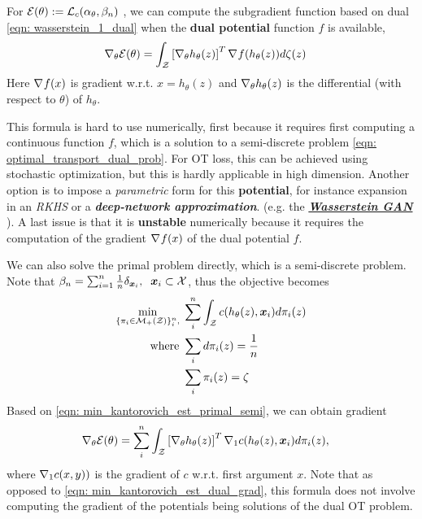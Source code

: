 \documentclass[11pt]{article}
\begin{document}
For ${\mathcal E}(\theta):={\mathcal L}_{c}(\alpha_{\theta}, \beta_{n})$ , we can compute the subgradient function based on dual \eqref{eqn: wasserstein_1_dual} when the \textbf{dual potential} function $f$ is available, 
\begin{align}
\nabla_{\theta}{{\mathcal E}(\theta)} &= \int_{{\mathcal Z}} \left[\nabla_{\theta}{h_{\theta}(z)}\right]^{T}\nabla_{}{f(h_{\theta}(z))} d\zeta(z)  \label{eqn: min_kantorovich_est_dual_grad}
\end{align} Here $\nabla_{}{f(x)}$ is gradient w.r.t. $x=h_{\theta}(z)$ and $\nabla_{\theta}{h_{\theta}(z)}$ is the differential (with respect to $\theta$) of $h_{\theta}$.

This formula is hard to use numerically, first because it requires first computing a continuous function $f$, which is a solution to a semi-discrete problem \eqref{eqn: optimal_transport_dual_prob}.  For OT loss, this can be achieved using stochastic optimization, but this is hardly applicable in high dimension. Another option is to impose a \emph{parametric} form for this \textbf{potential}, for instance expansion in an \emph{RKHS} or a \emph{\textbf{deep-network approximation}}. (e.g. the \underline{\textbf{\emph{Wasserstein GAN}}} \citep{arjovsky2017wasserstein}). A last issue is that it is \textbf{unstable} numerically because it requires the
computation of the gradient $\nabla_{}{f(x)}$ of the dual potential $f$.

We can also solve the primal problem directly, which is a semi-discrete problem. Note that $\beta_{n} = \sum_{i=1}^{n}\frac{1}{n}\delta_{\boldsymbol{x}_{i}}, \;\; \boldsymbol{x}_i \subset {\mathcal X}$, thus the objective becomes
\begin{align}
\min_{\{\pi_i \in {\mathcal M}_{+}({\mathcal Z})\}_{i}^{n}, }\;&\sum_{i}^{n}\int_{{\mathcal Z}}c(h_{\theta}(z), \boldsymbol{x}_i) d\pi_i(z)   \label{eqn: min_kantorovich_est_primal_semi}\\
 \text{where }& \sum_{i}d\pi_i(z) = \frac{1}{n} \nonumber \\
 &\sum_{i}\pi_i(z) = \zeta \nonumber
\end{align}
Based on \eqref{eqn: min_kantorovich_est_primal_semi}, we can obtain gradient
\begin{align}
\nabla_{\theta}{{\mathcal E}(\theta)} &=  \sum_{i}^{n} \int_{{\mathcal Z}} \left[\nabla_{\theta}{h_{\theta}(z)}\right]^{T}\nabla_{1}{c(h_{\theta}(z), \boldsymbol{x}_i)}d\pi_i(z),  \label{eqn: min_kantorovich_est_primal_grad}
\end{align} where $\nabla_{1}{c(x,y))}$ is the gradient of $c$ w.r.t. first argument $x$. Note that as opposed to \eqref{eqn: min_kantorovich_est_dual_grad},
this formula does not involve computing the gradient of the potentials being solutions of the dual OT problem.
\end{document}
